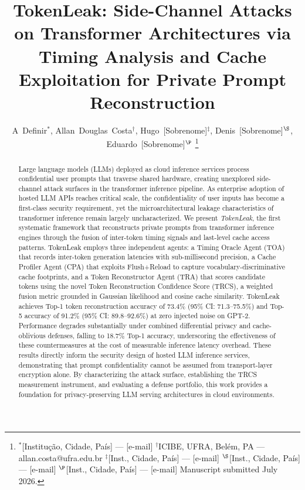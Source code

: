 \documentclass[conference,10pt,twocolumn]{IEEEtran}
\title{TokenLeak: Side-Channel Attacks on Transformer Architectures
       via Timing Analysis and Cache Exploitation for Private
       Prompt Reconstruction}
\author{A~Definir$^{*}$, Allan~Douglas~Costa$^{\dagger}$, Hugo~[Sobrenome]$^{\ddagger}$, Denis~[Sobrenome]$^{\S}$, Eduardo~[Sobrenome]$^{\P}$
\thanks{$^{*}$[Institu\c{c}\~{a}o, Cidade, Pa\'{i}s] — [e-mail] \quad
$^{\dagger}$ICIBE, UFRA, Bel\'{e}m, PA — allan.costa@ufra.edu.br \quad
$^{\ddagger}$[Inst., Cidade, Pa\'{i}s] — [e-mail] \quad
$^{\S}$[Inst., Cidade, Pa\'{i}s] — [e-mail] \quad
$^{\P}$[Inst., Cidade, Pa\'{i}s] — [e-mail] \quad
Manuscript submitted July 2026.}}
\begin{document}
\maketitle

\begin{abstract}
Large language models (LLMs) deployed as cloud inference services
process confidential user prompts that traverse shared hardware,
creating unexplored side-channel attack surfaces in the transformer
inference pipeline.
As enterprise adoption of hosted LLM APIs reaches critical scale,
the confidentiality of user inputs has become a first-class security
requirement, yet the microarchitectural leakage characteristics of
transformer inference remain largely uncharacterized.
We present \emph{TokenLeak}, the first systematic framework that
reconstructs private prompts from transformer inference engines
through the fusion of inter-token timing signals and last-level
cache access patterns.
TokenLeak employs three independent agents: a Timing Oracle Agent
(TOA) that records inter-token generation latencies with
sub-millisecond precision, a Cache Profiler Agent (CPA) that
exploits Flush+Reload to capture vocabulary-discriminative cache
footprints, and a Token Reconstructor Agent (TRA) that scores
candidate tokens using the novel Token Reconstruction Confidence
Score (TRCS), a weighted fusion metric grounded in Gaussian
likelihood and cosine cache similarity.
TokenLeak achieves Top-1 token reconstruction accuracy of 73.4\%
(95\% CI: 71.3--75.5\%) and Top-5 accuracy of 91.2\%
(95\% CI: 89.8--92.6\%) at zero injected noise on GPT-2.
Performance degrades substantially under combined differential
privacy and cache-oblivious defenses, falling to 18.7\% Top-1
accuracy, underscoring the effectiveness of these countermeasures
at the cost of measurable inference latency overhead.
These results directly inform the security design of hosted
LLM inference services, demonstrating that prompt confidentiality
cannot be assumed from transport-layer encryption alone.
By characterizing the attack surface, establishing the TRCS
measurement instrument, and evaluating a defense portfolio,
this work provides a foundation for privacy-preserving LLM
serving architectures in cloud environments.
\end{abstract}
\end{document}
